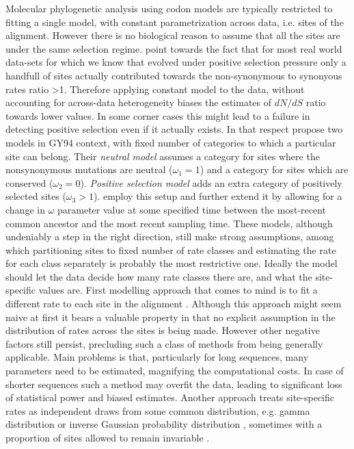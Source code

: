 Molecular phylogenetic analysis using codon models are typically restricted to fitting a single model, with constant parametrization across data, i.e. sites of the alignment.
However there is no biological reason to assume that all the sites are under the same selection regime.
\cite{NY98} point towards the fact that for most real world data-sets for which we know that evolved under positive selection pressure only a handfull of sites actually contributed towards the non-synonymous to synonyous rates ratio >1.
Therefore applying constant model to the data, without accounting for across-data heterogeneity biases the estimates of $dN/dS$ ratio towards lower values.
In some corner cases this might lead to a failure in detecting positive selection even if it actually exists.  
In that respect \cite{NY98} propose two models in GY94 context, with fixed number of categories to which a particular site can belong.
Their \emph{neutral model} assumes a category for sites where the nonsynonymous mutations are neutral ($\omega_1=1$) and a category for sites which are conserved ($\omega_2=0$).
\emph{Positive selection model} adds an extra category of positively selected sites ($\omega_3>1$).
\cite{Goode2008} employ this setup and further extend it by allowing for a change in $\omega$ parameter value at some specified time between the most-recent common ancestor and the most recent sampling time.
These models, although undeniably a step in the right direction, still make strong assumptions, among which partitioning sites to fixed number of rate classes and estimating the rate for each class separately is probably the most restrictive one.
Ideally the model should let the data decide how many rate classes there are, and what the site-specific values are.
First modelling approach that comes to mind is to fit a different rate to each site in the alignment \citep{Nielsen1997}.
Although this approach might seem naive at first it bears a valuable property in that no explicit assumption in the distribution of rates across the sites is being made.
However other negative factors still persist, precluding such a class of methods from being generally applicable.
Main problems is that, particularly for long sequences, many parameters need to be estimated, magnifying the computational costs.
In case of shorter sequences such a method may overfit the data, leading to significant loss of statistical power and biased estimates.
Another approach treats site-specific rates as independent draws from some common distribution, e.g. gamma distribution \citep{Yang1993} or inverse Gaussian probability distribution \citep{Waddell1997}, sometimes with a proportion of sites allowed to remain invariable \citep{Gu1995}.

